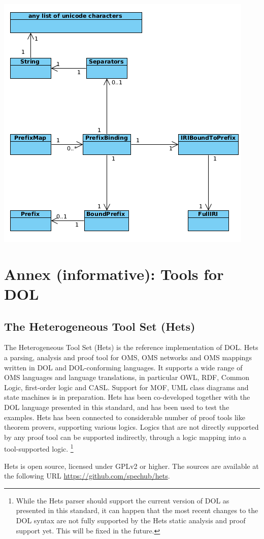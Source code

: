 \documentclass[10pt,fleqn,%
\ifpretendfinal
final%
\else
draft%
\fi,
]{scrreprt}
\newcommand{\sclause}[1]{\section{#1}}
\newcommand{\infannex}[1]{ \chapter{Annex (informative): #1} }
\begin{document}
\includegraphics[scale=0.6]{mof/dia/dia8.png}



\infannex{Tools for DOL}\label{a:tools}

\sclause{The Heterogeneous Tool Set (Hets)}\label{a:hets} The
Heterogeneous Tool Set (Hets) is the reference implementation of
DOL. Hets a parsing, analysis and proof tool
for OMS, OMS networks and OMS mappings written in DOL and
DOL-conforming languages.  It supports a wide range of OMS languages
and language translations, in particular OWL, RDF, Common Logic,
first-order logic and CASL. Support for MOF, UML class diagrams and
state machines is in preparation.  Hets has been co-developed together
with the DOL language presented in this standard, and has been used to
test the examples. Hets has been connected to considerable number of
proof tools like theorem provers, supporting various logics. Logics
that are not directly supported by any proof tool can be supported
indirectly, through a logic mapping into a tool-supported logic.
\footnote {While the Hets parser should support the
  current version of DOL as presented in this standard, it can happen
  that the most recent changes to the DOL syntax are not fully
  supported by the Hets static analysis and proof support yet. This
  will be fixed in the future. }

Hets is open source, licensed under GPLv2 or higher. The sources are
available at the following URL \url{https://github.com/spechub/hets}.
\end{document}
